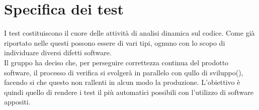 \section{Specifica dei test}
I test costituiscono il cuore delle attività di analisi dinamica sul codice. Come già riportato nelle \NdPv{} questi possono essere di vari tipi, ognuno con lo scopo di individuare diversi difetti software. \\
Il gruppo \Gruppo{} ha deciso che, per perseguire correttezza continua del prodotto software, il processo di verifica si svolgerà in parallelo con qullo di sviluppo(), facendo si che questo non rallenti in alcun modo la produzione. L'obiettivo è quindi quello di rendere i test il più automatici possibili con l'utilizzo di software appositi. 






